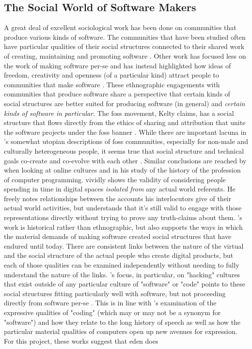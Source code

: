 \documentclass[a4paper,man,natbib]{apa6}
\begin{document}
  \subsection*{The Social World of Software Makers}
   A great deal of excellent sociological work has been done on communities that produce various kinds of software. The communities that have been studied often have particular qualities of their social structures connected to their shared work of creating, maintaining and promoting software \citep{Kelty2008-jm}. Other work has focused less on the work of making software per-se and has instead highlighted how ideas of freedom, creativity and openness (of a particular kind) attract people to communities that make software \citep{Gabriella_Coleman2012-lq}. These ethnographic engagements with communities that produce software share a perspective that certain kinds of social structures are better suited for producing software (in general) and \textit{certain kinds of software in particular}. The \acrshort{foss} movement, Kelty claims, has a social structure that flows directly from the ethics of sharing and attribution that unite the software projects under the \acrshort{foss} banner \citep{Kelty2008-jm}. While there are important lacuna in \citet{Kelty2008-jm}'s somewhat utopian descriptions of \acrshort{foss} communities, especially for non-male and culturally heterogeneous people, it seems true that social structure and technical goals co-create and co-evolve with each other \citep{Penny2013-ic, Dean2010-lk}. Similar conclusions are reached by \citet{Boellstorff2015-al} when looking at online cultures and \citet{Ensmenger2012-kz} in his study of the history of the profession of computer programming. \citet{Boellstorff2015-al} vividly shows the validity of considering people spending in time in digital spaces \textit{isolated from} any actual world referents. He freely notes relationships between the accounts his interlocutors give of their actual world activities, but understands that it's still valid to engage with those representations directly without trying to prove any truth-claims about them. \citet{Ensmenger2012-kz}'s work is historical rather than ethnographic, but also supports the ways in which the material demands of making software created social structures that have endured until today. There are consistent links between the nature of the virtual and the social structure of the actual people who create digital products, but each of those qualities can be examined independently without needing to fully understand the nature of the links. \citet{Gabriella_Coleman2012-lq}'s focus, in particular, on "hacking" cultures that exist outside of any particular culture of "software" or "code" points to these social structures fitting particularly well with software, but not proceeding directly from software per-se \citep{Drexler2019-ja}. This is in line with \citet{Cox2013-zo}'s examination of the expressive qualities of "coding" (which may or may not be a synonym for "software") and how they relate to the long history of speech as well as how the particular material qualities of computers open up new avenues for expression. For this project, these works suggest that \acrshort{eden} does 
\end{document}
